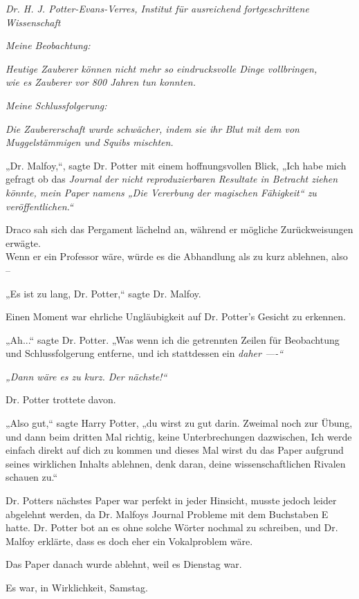 {\emph{Dr. H. J. Potter-Evans-Verres, Institut für ausreichend fortgeschrittene Wissenschaft}

\emph{Meine Beobachtung:}

\emph{Heutige Zauberer können nicht mehr so eindrucksvolle Dinge vollbringen,}\\ \emph{wie es Zauberer vor 800 Jahren tun konnten.}

\emph{Meine Schlussfolgerung:}

\emph{Die Zaubererschaft wurde schwächer, indem sie ihr Blut mit dem von Muggelstämmigen und Squibs mischten.}

„Dr. Malfoy,“, sagte Dr. Potter mit einem hoffnungsvollen Blick, „Ich habe mich gefragt ob das \emph{Journal der nicht reproduzierbaren Resultate in Betracht ziehen könnte, mein Paper namens „Die Vererbung der magischen Fähigkeit“ zu veröffentlichen.“}

Draco sah sich das Pergament lächelnd an, während er mögliche Zurückweisungen erwägte.\\ Wenn er ein Professor wäre, würde es die Abhandlung als zu kurz ablehnen, also --

„Es ist zu lang, Dr. Potter,“ sagte Dr. Malfoy.

Einen Moment war ehrliche Ungläubigkeit auf Dr. Potter's Gesicht zu erkennen.

„Ah...“ sagte Dr. Potter. „Was wenn ich die getrennten Zeilen für Beobachtung und Schlussfolgerung entferne, und ich stattdessen ein \emph{daher ----“}

\emph{„Dann wäre es zu kurz. Der nächste!“}

Dr. Potter trottete davon.

„Also gut,“ sagte Harry Potter, „du wirst zu gut darin. Zweimal noch zur Übung, und dann beim dritten Mal richtig, keine Unterbrechungen dazwischen, Ich werde einfach direkt auf dich zu kommen und dieses Mal wirst du das Paper aufgrund seines wirklichen Inhalts ablehnen, denk daran, deine wissenschaftlichen Rivalen schauen zu.“

Dr. Potters nächstes Paper war perfekt in jeder Hinsicht, musste jedoch leider abgelehnt werden, da Dr. Malfoys Journal Probleme mit dem Buchstaben E hatte. Dr. Potter bot an es ohne solche Wörter nochmal zu schreiben, und Dr. Malfoy erklärte, dass es doch eher ein Vokalproblem wäre.

Das Paper danach wurde ablehnt, weil es Dienstag war.

Es war, in Wirklichkeit, Samstag.

}
